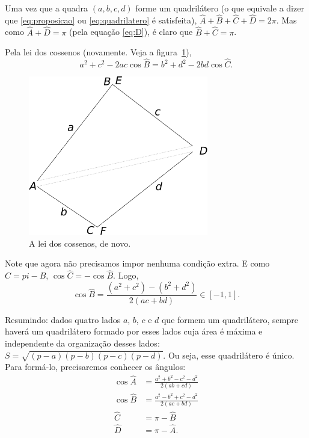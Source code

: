 \documentclass[a4paper,12pt]{scrartcl}
\begin{document}
  Uma vez que a quadra $(a,b,c,d)$ forme um quadrilátero (o que equivale a dizer que \eqref{eq:proposicao} ou \eqref{eq:quadrilatero} é satisfeita), $\hat A + \hat B + \hat C + \hat D = 2\pi$. Mas como $\hat A + \hat D = \pi$ (pela equação \ref{eq:D}), é claro que $\hat B + \hat C = \pi$.
  
  Pela lei dos cossenos (novamente. Veja a figura~\ref{fig:cossenos-2}),
  \begin{equation*}
   a^2 + c^2 - 2ac\cos\hat B = b^2 + d^2 - 2bd\cos \hat C.
  \end{equation*}
  
  \begin{figure}
    \centering
   \includegraphics[width=0.7\textwidth]{figura2.png}
   \caption{A lei dos cossenos, de novo.}
   \label{fig:cossenos-2}
  \end{figure}
  
  Note que agora não precisamos impor nenhuma condição extra. E como $\hat C = pi - \hat B$, $\cos \hat C = -\cos \hat B$. Logo,
  \begin{equation}
   \cos \hat B = \frac{(a^2 + c^2) - (b^2 + d^2)}{2(ac + bd)} \in [-1,1].
  \end{equation}
  
  Resumindo: dados quatro lados $a$, $b$, $c$ e $d$ que formem um quadrilátero, sempre haverá um quadrilátero formado por esses lados cuja área é máxima e independente da organização desses lados: $S = \sqrt{(p-a)(p-b)(p-c)(p-d)}$. Ou seja, esse quadrilátero é único. Para formá-lo, precisaremos conhecer os ângulos:
  \begin{align*}
   \cos\hat A &= \frac{a^2+b^2-c^2-d^2}{2(ab+cd)} \\
   \cos\hat B &= \frac{a^2-b^2+c^2-d^2}{2(ac + bd)} \\
       \hat C &= \pi - \hat B \\
       \hat D &= \pi - \hat A.
  \end{align*}
\end{document}
